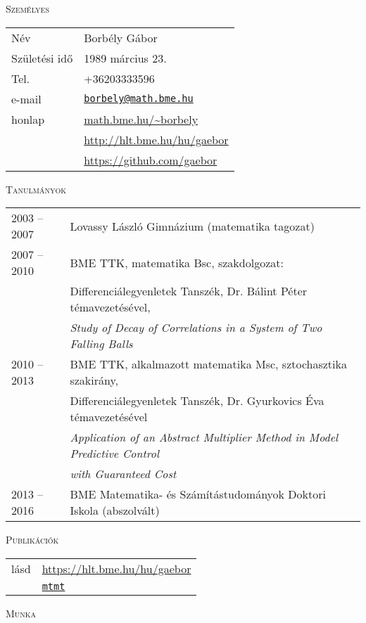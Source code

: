 \documentclass[12pt]{article}
\newcommand\mail[1]{\href{mailto:#1}{\texttt{#1}}}
\begin{document}
 \thispagestyle{empty}

\textsc{Személyes}

       \begin{tabular}{p{3cm}l}
	       Név & Borbély Gábor \\
           Születési idő & 1989 március 23.\\
		   Tel. &  +36203333596\\
		   e-mail & \mail{borbely@math.bme.hu}\\
		   honlap & \url{math.bme.hu/~borbely} \\
                  & \url{http://hlt.bme.hu/hu/gaebor} \\
                  & \url{https://github.com/gaebor}
       \end{tabular}
 
 \textsc{Tanulmányok}
 
 \begin{tabular}{p{3cm}l}
	       2003 -- 2007 & Lovassy László Gimnázium (matematika tagozat) \\
           2007 -- 2010& BME TTK, matematika Bsc, szakdolgozat: \\
		              & Differenciálegyenletek Tanszék, Dr. Bálint Péter témavezetésével, \\
					  & \emph{Study of Decay of Correlations in a System of Two Falling Balls} \\
		   2010 -- 2013 & BME TTK, alkalmazott matematika Msc, sztochasztika szakirány,\\
						& Differenciálegyenletek Tanszék, Dr. Gyurkovics Éva témavezetésével \\
						& \emph{Application of an Abstract Multiplier Method in Model Predictive Control}\\ & \emph{ with Guaranteed Cost} \\
		   2013 -- 2016 & BME Matematika- és Számítástudományok Doktori Iskola (abszolvált)
       \end{tabular}

 \textsc{Publikációk}

        \begin{tabular}{p{3cm}l}
	       lásd & \url{https://hlt.bme.hu/hu/gaebor} \\ 
               &  \href{https://m2.mtmt.hu/gui2/?type=authors&mode=browse&sel=10043154}{\texttt{mtmt}}
       \end{tabular}  

 \textsc{Munka}
\end{document}
